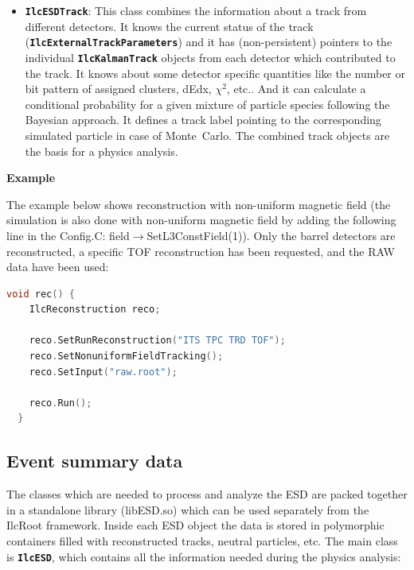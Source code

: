 \documentclass[12pt,a4paper,twoside]{article}
\makeatletter
\newcommand{\class}[1]{\texttt{\textbf{#1}}\xspace}
\newcommand {\MC} {Monte~Carlo\@\xspace}
\newcommand {\ilcroot} {IlcRoot\@\xspace}
\makeatother
\begin{document}
\begin{itemize}
\item \class{IlcESDTrack}: 
  This class combines the information about a track from different detectors.
  It knows the current status of the track
  (\class{IlcExternalTrackParameters}) and it has (non-persistent) pointers
  to the individual \class{IlcKalmanTrack} objects from each detector
  which contributed to the track. 
  It knows about some detector specific quantities like the number or
  bit pattern of assigned clusters, dEdx, $\chi^2$, etc.. 
  And it can calculate a conditional probability for a given mixture of
  particle species following the Bayesian approach.
  It defines a track label pointing to the corresponding simulated
  particle in case of \MC. 
  The combined track objects are the basis for a physics analysis.

\end{itemize}

\noindent
\textbf{Example}

The example below shows reconstruction with non-uniform magnetic field
(the simulation is also done with non-uniform magnetic field by adding
the following line in the Config.C: field$\to$SetL3ConstField(1)). Only
the barrel detectors are reconstructed, a specific TOF reconstruction
has been requested, and the RAW data have been used:

\begin{lstlisting}[language=C++]
  void rec() {
    IlcReconstruction reco;

    reco.SetRunReconstruction("ITS TPC TRD TOF");
    reco.SetNonuniformFieldTracking();
    reco.SetInput("raw.root");

    reco.Run();
  }
\end{lstlisting}


\subsection{Event summary data}\label{ESD}

The classes which are needed to process and analyze the ESD are packed
together in a standalone library (libESD.so) which can be used
separately from the \ilcroot framework. Inside each 
ESD object the data is stored in polymorphic containers filled with
reconstructed tracks, neutral particles, etc. The main class is
\class{IlcESD}, which contains all the information needed during the
physics analysis:
\end{document}
